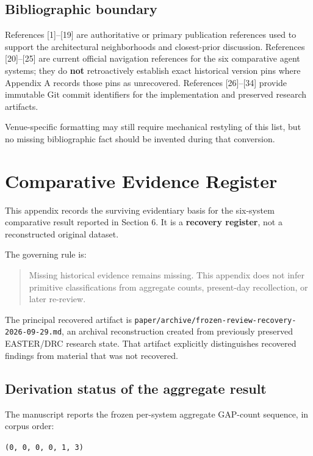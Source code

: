 \documentclass[11pt]{article}
\begin{document}
\subsection{Bibliographic boundary}

References [1]--[19] are authoritative or primary publication references used to support the architectural neighborhoods and closest-prior discussion. References [20]--[25] are current official navigation references for the six comparative agent systems; they do \textbf{not} retroactively establish exact historical version pins where Appendix A records those pins as unrecovered. References [26]--[34] provide immutable Git commit identifiers for the implementation and preserved research artifacts.

Venue-specific formatting may still require mechanical restyling of this list, but no missing bibliographic fact should be invented during that conversion.
\appendix
\section{Comparative Evidence Register}

This appendix records the surviving evidentiary basis for the six-system comparative result reported in Section 6. It is a \textbf{recovery register}, not a reconstructed original dataset.

The governing rule is:

\begin{quote}
Missing historical evidence remains missing. This appendix does not infer primitive classifications from aggregate counts, present-day recollection, or later re-review.
\end{quote}

The principal recovered artifact is \texttt{paper/archive/frozen-review-recovery-2026-09-29.md}, an archival reconstruction created from previously preserved EASTER/DRC research state. That artifact explicitly distinguishes recovered findings from material that was not recovered.

\subsection{Derivation status of the aggregate result}

The manuscript reports the frozen per-system aggregate GAP-count sequence, in corpus order:

\texttt{(0, 0, 0, 0, 1, 3)}
\end{document}
